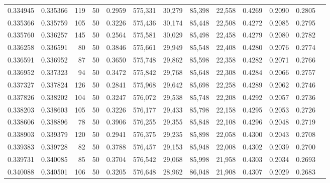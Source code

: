 \begin{tabular}{rrrrrrrrrrrrr}
0.334945 & 0.335366 &   119 &  50 &                                     0.2959 & 575,331 &  30,279 &  85,398 &  22,558 & 0.4269 & 0.2090 & 0.2805 \\
0.335366 & 0.335759 &   105 &  50 &                                     0.3226 & 575,436 &  30,174 &  85,448 &  22,508 & 0.4272 & 0.2085 & 0.2795 \\
0.335760 & 0.336257 &   145 &  50 &                                     0.2564 & 575,581 &  30,029 &  85,498 &  22,458 & 0.4279 & 0.2080 & 0.2782 \\
0.336258 & 0.336591 &    80 &  50 &                                     0.3846 & 575,661 &  29,949 &  85,548 &  22,408 & 0.4280 & 0.2076 & 0.2774 \\
0.336591 & 0.336952 &    87 &  50 &                                     0.3650 & 575,748 &  29,862 &  85,598 &  22,358 & 0.4282 & 0.2071 & 0.2766 \\
0.336952 & 0.337323 &    94 &  50 &                                     0.3472 & 575,842 &  29,768 &  85,648 &  22,308 & 0.4284 & 0.2066 & 0.2757 \\
0.337327 & 0.337824 &   126 &  50 &                                     0.2841 & 575,968 &  29,642 &  85,698 &  22,258 & 0.4289 & 0.2062 & 0.2746 \\
0.337826 & 0.338202 &   104 &  50 &                                     0.3247 & 576,072 &  29,538 &  85,748 &  22,208 & 0.4292 & 0.2057 & 0.2736 \\
0.338203 & 0.338603 &   105 &  50 &                                     0.3226 & 576,177 &  29,433 &  85,798 &  22,158 & 0.4295 & 0.2053 & 0.2726 \\
0.338606 & 0.338896 &    78 &  50 &                                     0.3906 & 576,255 &  29,355 &  85,848 &  22,108 & 0.4296 & 0.2048 & 0.2719 \\
0.338903 & 0.339379 &   120 &  50 &                                     0.2941 & 576,375 &  29,235 &  85,898 &  22,058 & 0.4300 & 0.2043 & 0.2708 \\
0.339383 & 0.339728 &    82 &  50 &                                     0.3788 & 576,457 &  29,153 &  85,948 &  22,008 & 0.4302 & 0.2039 & 0.2700 \\
0.339731 & 0.340085 &    85 &  50 &                                     0.3704 & 576,542 &  29,068 &  85,998 &  21,958 & 0.4303 & 0.2034 & 0.2693 \\
0.340088 & 0.340501 &   106 &  50 &                                     0.3205 & 576,648 &  28,962 &  86,048 &  21,908 & 0.4307 & 0.2029 & 0.2683 \\

\end{tabular}
